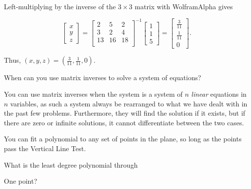 \documentclass[../gatm_answers.tex]{subfiles}
\begin{document}
Left-multiplying by the inverse of the $3\times 3$ matrix with WolframAlpha gives

$$\begin{bmatrix}
x \\ y \\ z \end{bmatrix} = \begin{bmatrix}
2 & 5 & 2 \\
3 & 2 & 4 \\
13 & 16 & 18 \\
\end{bmatrix}^{-1}\begin{bmatrix} 1 \\ 1 \\ 5 \end{bmatrix} = \begin{bmatrix} \frac{3}{11} \\ \frac{1}{11} \\ 0 \end{bmatrix}.$$

Thus, $(x,y,z)=\left(\frac{3}{11},\frac{1}{11},0\right)$.

\begin{inner_problem}
\item When can you use matrix inverses to solve a system of equations?
\end{inner_problem}

You can use matrix inverses when the system is a system of $n$ \textit{linear} equations in $n$ variables, as such a system always be rearranged to what we have dealt with in the past few problems. Furthermore, they will find the solution if it exists, but if there are zero or infinite solutions, it cannot differentiate between the two cases.

\begin{outer_problem}
\item You can fit a polynomial to any set of points in the plane, so long as the points pass the Vertical Line Test.
\end{outer_problem}

\begin{inner_problem}[start=1]
\item What is the least degree polynomial through
\end{inner_problem}

\begin{iinner_problem}[start=1]
\item One point?
\end{iinner_problem}
\end{document}

